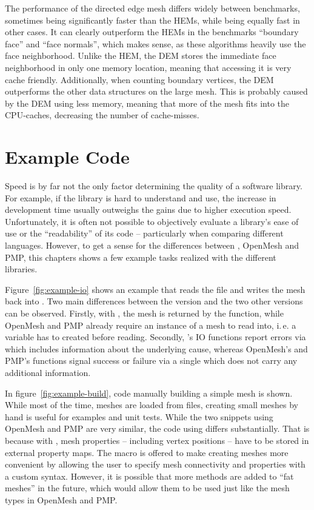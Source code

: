 The performance of the directed edge mesh differs widely between benchmarks, sometimes being significantly faster than the HEMs, while being equally fast in other cases.
It can clearly outperform the HEMs in the benchmarks \enquote{boundary face} and \enquote{face normals}, which makes sense, as these algorithms heavily use the face neighborhood.
Unlike the HEM, the DEM stores the immediate face neighborhood in only one memory location, meaning that accessing it is very cache friendly.
Additionally, when counting boundary vertices, the DEM outperforms the other data structures on the large mesh.
This is probably caused by the DEM using less memory, meaning that more of the mesh fits into the CPU-caches, decreasing the number of cache-misses.



\newpage
\section{Example Code}

Speed is by far not the only factor determining the quality of a software library.
For example, if the library is hard to understand and use, the increase in development time usually outweighs the gains due to higher execution speed.
Unfortunately, it is often not possible to objectively evaluate a library's ease of use or the \enquote{readability} of its code -- particularly when comparing different languages.
However, to get a sense for the differences between , OpenMesh and PMP, this chapters shows a few example tasks realized with the different libraries.

Figure~\ref{fig:example-io} shows an example that reads the file  and writes the mesh back into .
Two main differences between the  version and the two other versions can be observed.
Firstly, with , the mesh is returned by the  function, while OpenMesh and PMP already require an instance of a mesh to read into, i.\,e. a variable has to created before reading.
Secondly, 's IO functions report errors via  which includes information about the underlying cause, whereas OpenMesh's and PMP's functions signal success or failure via a single  which does not carry any additional information.

In figure~\ref{fig:example-build}, code manually building a simple mesh is shown.
While most of the time, meshes are loaded from files, creating small meshes by hand is useful for examples and unit tests.
While the two snippets using OpenMesh and PMP are very similar, the code using  differs substantially.
That is because with , mesh properties -- including vertex positions -- have to be stored in external property maps.
The  macro is offered to make creating meshes more convenient by allowing the user to specify mesh connectivity and properties with a custom syntax.
However, it is possible that more methods are added to \enquote{fat meshes} in the future, which would allow them to be used just like the mesh types in OpenMesh and PMP.

